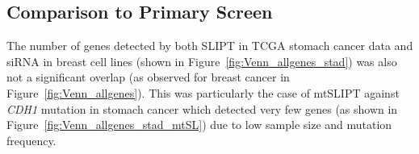 

\FloatBarrier

\subsection{Comparison to Primary Screen} \label{chapt3:compare_SL_genes_stad}

The number of genes detected by both \gls{SLIPT} in \gls{TCGA} stomach cancer data and \gls{siRNA} in breast cell lines (shown in Figure~\ref{fig:Venn_allgenes_stad}) was also not a significant overlap (as observed for breast cancer in Figure~\ref{fig:Venn_allgenes}). This was particularly the case of \acrshort{mtSLIPT} against \textit{CDH1} \gls{mutation} in stomach cancer which detected very few genes (as shown in Figure~\ref{fig:Venn_allgenes_stad_mtSL}) due to low sample size and \gls{mutation} frequency.

